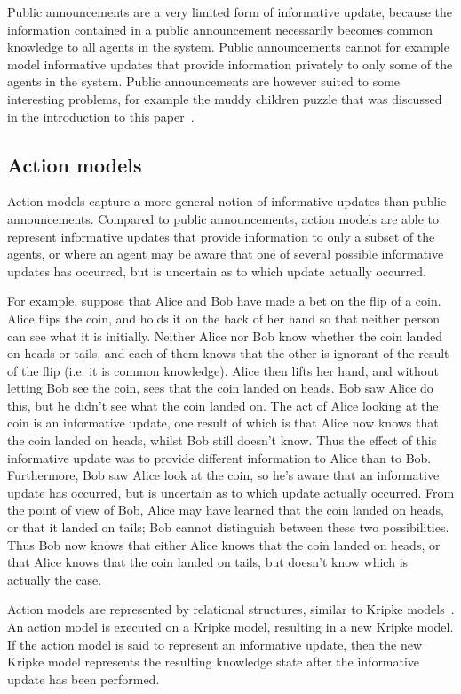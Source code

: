 Public announcements are a very limited form of informative update, because the
information contained in a public announcement necessarily becomes common
knowledge to all agents in the system. Public announcements cannot for example
model informative updates that provide information privately to only some of
the agents in the system. Public announcements are however suited to some
interesting problems, for example the muddy children puzzle that was discussed
in the introduction to this paper~\cite{vanditmarsch2007dynamic}.

\subsection{Action models}\label{litreview-am}

Action models capture a more general notion of informative updates than public
announcements. Compared to public announcements, action models are able to
represent informative updates that provide information to only a subset of the
agents, or where an agent may be aware that one of several possible informative
updates has occurred, but is uncertain as to which update actually occurred. 

For example, suppose that Alice and Bob have made a bet on the flip of a coin.
Alice flips the coin, and holds it on the back of her hand so that neither
person can see what it is initially. Neither Alice nor Bob know whether the coin
landed on heads or tails, and each of them knows that the other is ignorant of
the result of the flip (i.e. it is common knowledge). Alice then lifts her hand,
and without letting Bob see the coin, sees that the coin landed on heads. Bob
saw Alice do this, but he didn't see what the coin landed on. The act of Alice
looking at the coin is an informative update, one result of which is that Alice
now knows that the coin landed on heads, whilst Bob still doesn't know. Thus the
effect of this informative update was to provide different information to Alice
than to Bob.  Furthermore, Bob saw Alice look at the coin, so he's aware that an
informative update has occurred, but is uncertain as to which update actually
occurred. From the point of view of Bob, Alice may have learned that the coin
landed on heads, or that it landed on tails; Bob cannot distinguish between
these two possibilities. Thus Bob now knows that either Alice knows that the
coin landed on heads, or that Alice knows that the coin landed on tails, but
doesn't know which is actually the case.

Action models are represented by relational structures, similar to Kripke
models~\cite{vanditmarsch2007dynamic}. An action model is executed on a Kripke
model, resulting in a new Kripke model. If the action model is said to represent
an informative update, then the new Kripke model represents the resulting
knowledge state after the informative update has been performed.

